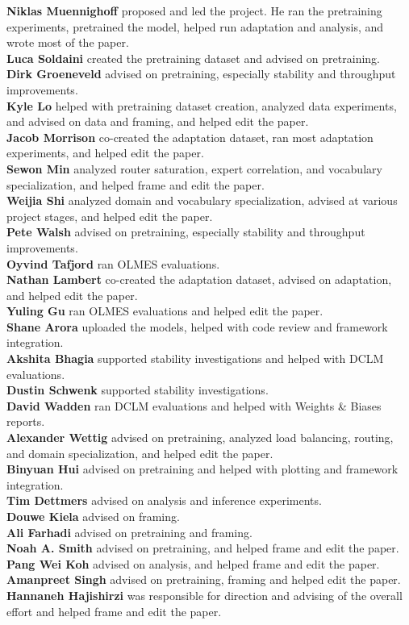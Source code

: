 \documentclass{article}
\begin{document}
\textbf{Niklas Muennighoff} proposed and led the project. He ran the pretraining experiments, pretrained the model, helped run adaptation and analysis, and wrote most of the paper.\\
\textbf{Luca Soldaini} created the pretraining dataset and advised on pretraining.\\
\textbf{Dirk Groeneveld} advised on pretraining, especially stability and throughput improvements.\\
\textbf{Kyle Lo} helped with pretraining dataset creation, analyzed data experiments, and advised on data and framing, and helped edit the paper.\\
\textbf{Jacob Morrison} co-created the adaptation dataset, ran most adaptation experiments, and helped edit the paper.\\
\textbf{Sewon Min} analyzed router saturation, expert correlation, and vocabulary specialization, and helped frame and edit the paper.\\
\textbf{Weijia Shi} analyzed domain and vocabulary specialization, advised at various project stages, and helped edit the paper.\\
\textbf{Pete Walsh} advised on pretraining, especially stability and throughput improvements.\\
\textbf{Oyvind Tafjord} ran OLMES evaluations.\\
\textbf{Nathan Lambert} co-created the adaptation dataset, advised on adaptation, and helped edit the paper.\\
\textbf{Yuling Gu} ran OLMES evaluations and helped edit the paper.\\
\textbf{Shane Arora} uploaded the models, helped with code review and framework integration.\\
\textbf{Akshita Bhagia} supported stability investigations and helped with DCLM evaluations.\\
\textbf{Dustin Schwenk} supported stability investigations.\\
\textbf{David Wadden} ran DCLM evaluations and helped with Weights \& Biases reports.\\
\textbf{Alexander Wettig} advised on pretraining, analyzed load balancing, routing, and domain specialization, and helped edit the paper.\\
\textbf{Binyuan Hui} advised on pretraining and helped with plotting and framework integration.\\
\textbf{Tim Dettmers} advised on analysis and inference experiments.\\
\textbf{Douwe Kiela} advised on framing.\\
\textbf{Ali Farhadi} advised on pretraining and framing.\\
\textbf{Noah A. Smith} advised on pretraining, and helped frame and edit the paper.\\
\textbf{Pang Wei Koh} advised on analysis, and helped frame and edit the paper.\\
\textbf{Amanpreet Singh} advised on pretraining, framing and helped edit the paper.\\
\textbf{Hannaneh Hajishirzi} was responsible for direction and advising of the overall effort and helped frame and edit the paper.
\end{document}

